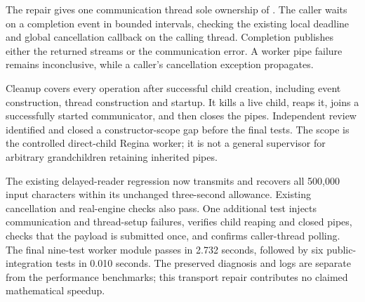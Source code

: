 The repair gives one communication thread sole ownership of
. The caller waits on a completion event in
bounded intervals, checking the existing local deadline and global
cancellation callback on the calling thread. Completion publishes either
the returned streams or the communication error. A worker pipe failure
remains inconclusive, while a caller's cancellation exception propagates.

Cleanup covers every operation after successful child creation, including
event construction, thread construction and startup. It kills a live
child, reaps it, joins a successfully started communicator, and then closes
the pipes. Independent review identified and closed a constructor-scope
gap before the final tests. The scope is the controlled direct-child
Regina worker; it is not a general supervisor for arbitrary grandchildren
retaining inherited pipes.

The existing delayed-reader regression now transmits and recovers all
500,000 input characters within its unchanged three-second allowance.
Existing cancellation and real-engine checks also pass. One additional
test injects communication and thread-setup failures, verifies child
reaping and closed pipes, checks that the payload is submitted once, and
confirms caller-thread polling. The final nine-test worker module passes
in 2.732 seconds, followed by six public-integration tests in 0.010 seconds.
The preserved diagnosis and logs are separate from the performance
benchmarks; this transport repair contributes no claimed mathematical
speedup.
